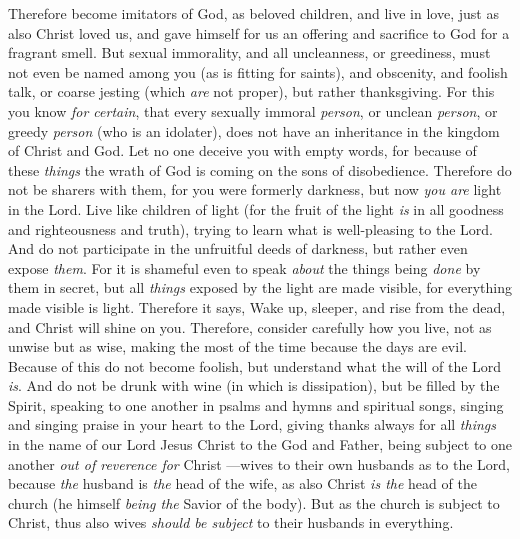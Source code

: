 \begin{biblechapter} %
 Therefore become imitators of God, as beloved children,
\verse and live in love, just as also Christ loved us, and gave himself for us an offering and sacrifice to God for a fragrant smell.
\verse But sexual immorality, and all uncleanness, or greediness, must not even be named among you (as is fitting for saints),
\verse and obscenity, and foolish talk, or coarse jesting (which \textit{are} not proper), but rather thanksgiving.
\verse For this you know \textit{for certain}, that every sexually immoral \textit{person}, or unclean \textit{person}, or greedy \textit{person} (who is an idolater), does not have an inheritance in the kingdom of Christ and God.
\verse Let no one deceive you with empty words, for because of these \textit{things} the wrath of God is coming on the sons of disobedience.
 Therefore do not be sharers with them,
\verse for you were formerly darkness, but now \textit{you are} light in the Lord. Live like children of light
\verse (for the fruit of the light \textit{is} in all goodness and righteousness and truth),
\verse trying to learn what is well-pleasing to the Lord.
\verse And do not participate in the unfruitful deeds of darkness, but rather even expose \textit{them}.
\verse For it is shameful even to speak \textit{about} the things being \textit{done} by them in secret,
\verse but all \textit{things} exposed by the light are made visible,
\verse for everything made visible is light. Therefore it says, Wake up, sleeper, 
and rise from the dead, 
and Christ will shine on you.
\verse Therefore, consider carefully how you live, not as unwise but as wise,
\verse making the most of the time because the days are evil.
 Because of this do not become foolish, but understand what the will of the Lord \textit{is}.
\verse And do not be drunk with wine (in which is dissipation), but be filled by the Spirit,
\verse speaking to one another in psalms and hymns and spiritual songs, singing and singing praise in your heart to the Lord,
\verse giving thanks always for all \textit{things} in the name of our Lord Jesus Christ to the God and Father,
\verse being subject to one another \textit{out of reverence for} Christ
\verse —wives to their own husbands as to the Lord,
\verse because \textit{the} husband is \textit{the} head of the wife, as also Christ \textit{is the} head of the church (he himself \textit{being the} Savior of the body).
\verse But as the church is subject to Christ, thus also wives \textit{should be subject} to their husbands in everything.

\end{biblechapter}
